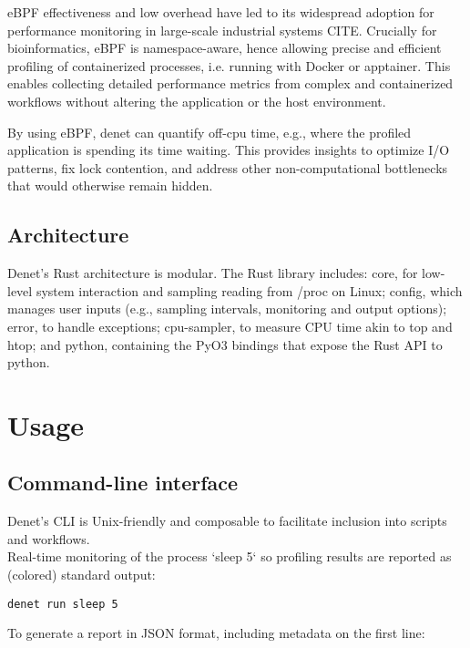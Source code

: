 \documentclass[10pt]{article}
\begin{document}
eBPF effectiveness and low overhead have led to its widespread adoption for performance monitoring in large-scale industrial systems {\color{red} CITE}. Crucially for bioinformatics, eBPF is namespace-aware, hence allowing precise and efficient profiling of containerized processes, i.e. running with Docker or apptainer. This enables collecting detailed performance metrics from complex and containerized workflows without altering the application or the host environment.

By using eBPF, denet can quantify off-cpu time, e.g., where the profiled application is spending its time waiting. This provides insights to optimize I/O patterns, fix lock contention, and address other non-computational bottlenecks that would otherwise remain hidden.

\subsection{Architecture}

Denet's Rust architecture is modular. The Rust library includes: core, for low-level system interaction and sampling reading from /proc on Linux; config, which manages user inputs (e.g., sampling intervals, monitoring and output options); error, to handle exceptions; cpu-sampler, to measure CPU time akin to top and htop; and python, containing the PyO3 bindings that expose the Rust API to python.

\section{Usage}

\subsection{Command-line interface}

Denet's CLI is Unix-friendly \cite{raymond1999cathedral} and composable to facilitate inclusion into scripts and workflows. \\

\noindent Real-time monitoring of the process `sleep 5` so profiling results are reported as (colored) standard output:

\begin{verbatim}
denet run sleep 5
\end{verbatim}

\noindent To generate a report in JSON format, including metadata on the first line:
\end{document}
